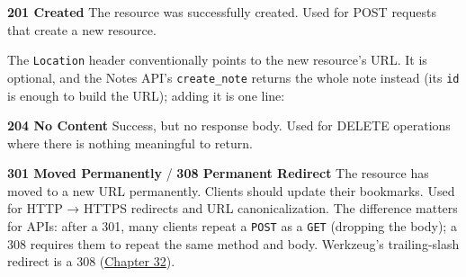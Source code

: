 \noindent{}\textbf{201 Created}
The resource was successfully created. Used for POST requests that create a new resource.

\begin{codebox}[short]

\begin{Shaded}
\begin{Highlighting}[]
\end{Highlighting}
\end{Shaded}

\end{codebox}

\noindent{}The \texttt{Location} header conventionally points to the new resource's URL. It is optional, and the Notes API's \texttt{create\_note} returns the whole note instead (its \texttt{id} is enough to build the URL); adding it is one line:

\begin{codebox}[short]

\begin{Shaded}
\begin{Highlighting}[]
\NormalTok{, \{}\OperatorTok{=}\NormalTok{note[}\NormalTok{])\}}
\end{Highlighting}
\end{Shaded}

\end{codebox}

\noindent{}\textbf{204 No Content}
Success, but no response body. Used for DELETE operations where there is nothing meaningful to return.

\begin{codebox}[short]

\begin{Shaded}
\begin{Highlighting}[]
 \NormalTok{, }
\end{Highlighting}
\end{Shaded}

\end{codebox}

\noindent{}\textbf{301 Moved Permanently} / \textbf{308 Permanent Redirect}
The resource has moved to a new URL permanently. Clients should update their bookmarks. Used for HTTP → HTTPS redirects and URL canonicalization. The difference matters for APIs: after a 301, many clients repeat a \texttt{POST} as a \texttt{GET} (dropping the body); a 308 requires them to repeat the same method and body. Werkzeug's trailing-slash redirect is a 308 (\hyperref[ch:32-routing]{Chapter 32}).

